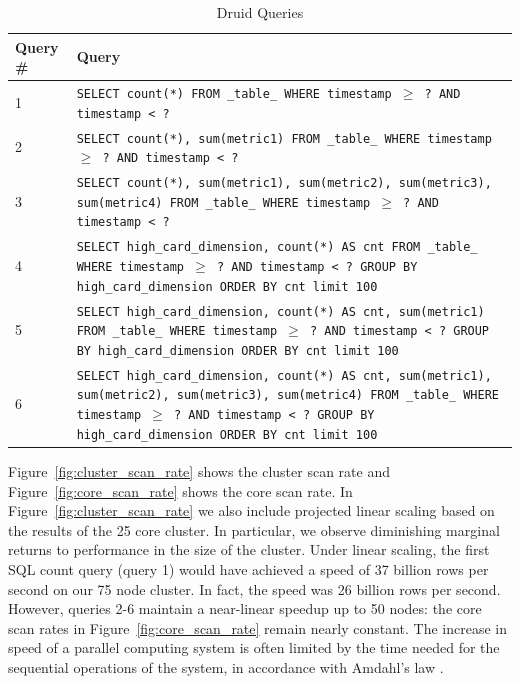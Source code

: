 \documentclass{acm_proc_article-sp}
\begin{document}
\begin{table}
  \centering
  \caption{Druid Queries}
  \label{tab:sql_queries}
  \begin{tabular}{| l | p{15cm} |}
    \hline
    \textbf{Query \#} & \textbf{Query} \\ \hline
    1 & \texttt{SELECT count(*) FROM \_table\_ WHERE timestamp $\geq$ ? AND timestamp < ?} \\ \hline
    2 & \texttt{SELECT count(*), sum(metric1) FROM \_table\_ WHERE timestamp $\geq$ ? AND timestamp < ?} \\ \hline
    3 & \texttt{SELECT count(*), sum(metric1), sum(metric2), sum(metric3), sum(metric4) FROM \_table\_ WHERE timestamp $\geq$ ? AND timestamp < ?} \\ \hline
    4 & \texttt{SELECT high\_card\_dimension, count(*) AS cnt FROM \_table\_ WHERE timestamp $\geq$ ? AND timestamp < ? GROUP BY high\_card\_dimension ORDER BY cnt limit 100} \\ \hline
    5 & \texttt{SELECT high\_card\_dimension, count(*) AS cnt, sum(metric1) FROM \_table\_ WHERE timestamp $\geq$ ? AND timestamp < ? GROUP BY high\_card\_dimension ORDER BY cnt limit 100} \\ \hline
    6 & \texttt{SELECT high\_card\_dimension, count(*) AS cnt, sum(metric1), sum(metric2), sum(metric3), sum(metric4) FROM \_table\_ WHERE timestamp $\geq$ ? AND timestamp < ? GROUP BY high\_card\_dimension ORDER BY cnt limit 100} \\ \hline
  \end{tabular}
\end{table}

Figure~\ref{fig:cluster_scan_rate} shows the cluster scan rate and
Figure~\ref{fig:core_scan_rate} shows the core scan rate.  In
Figure~\ref{fig:cluster_scan_rate} we also include projected linear scaling
based on the results of the 25 core cluster.  In particular, we observe
diminishing marginal returns to performance in the size of the cluster.  Under
linear scaling, the first SQL count query (query 1) would have achieved a speed
of 37 billion rows per second on our 75 node cluster.  In fact, the speed was
26 billion rows per second.  However, queries 2-6 maintain a near-linear
speedup up to 50 nodes: the core scan rates in Figure~\ref{fig:core_scan_rate}
remain nearly constant.  The increase in speed of a parallel computing system
is often limited by the time needed for the sequential operations of the
system, in accordance with Amdahl's law \cite{amdahl1967validity}.
\end{document}
